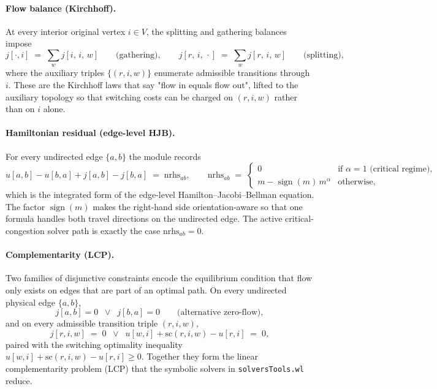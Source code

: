 \documentclass[11pt]{article}
\begin{document}
\paragraph{Flow balance (Kirchhoff).} At every interior original vertex $i \in V$, the splitting and gathering balances impose
\[
j[\cdot,i] \;=\; \sum_{w} j[i,\,i,\,w]
\qquad\text{(gathering)},
\qquad
j[r,\,i,\,\cdot] \;=\; \sum_{w} j[r,\,i,\,w]
\qquad\text{(splitting)},
\]
where the auxiliary triples $\{(r, i, w)\}$ enumerate admissible transitions through $i$. These are the Kirchhoff laws that say "flow in equals flow out", lifted to the auxiliary topology so that switching costs can be charged on $(r, i, w)$ rather than on $i$ alone.

\paragraph{Hamiltonian residual (edge-level HJB).} For every undirected edge $\{a, b\}$ the module records
\[
u[a, b] - u[b, a] + j[a, b] - j[b, a] \;=\; \mathrm{nrhs}_{ab},
\qquad
\mathrm{nrhs}_{ab} \;=\;
\begin{cases}
0 & \text{if } \alpha = 1 \text{ (critical regime)}, \\[2pt]
m - \operatorname{sign}(m)\, m^{\alpha} & \text{otherwise},
\end{cases}
\]
which is the integrated form of the edge-level Hamilton--Jacobi--Bellman equation. The factor $\operatorname{sign}(m)$ makes the right-hand side orientation-aware so that one formula handles both travel directions on the undirected edge. The active critical-congestion solver path is exactly the case $\mathrm{nrhs}_{ab} = 0$.

\paragraph{Complementarity (LCP).} Two families of disjunctive constraints encode the equilibrium condition that flow only exists on edges that are part of an optimal path. On every undirected physical edge $\{a, b\}$,
\[
j[a, b] = 0 \;\;\vee\;\; j[b, a] = 0
\qquad\text{(alternative zero-flow)},
\]
and on every admissible transition triple $(r, i, w)$,
\[
j[r, i, w] \;=\; 0 \;\;\vee\;\; u[w, i] + \mathrm{sc}(r, i, w) - u[r, i] \;=\; 0,
\]
paired with the switching optimality inequality $u[w, i] + \mathrm{sc}(r, i, w) - u[r, i] \ge 0$. Together they form the linear complementarity problem (LCP) that the symbolic solvers in \texttt{solversTools.wl} reduce.
\end{document}
